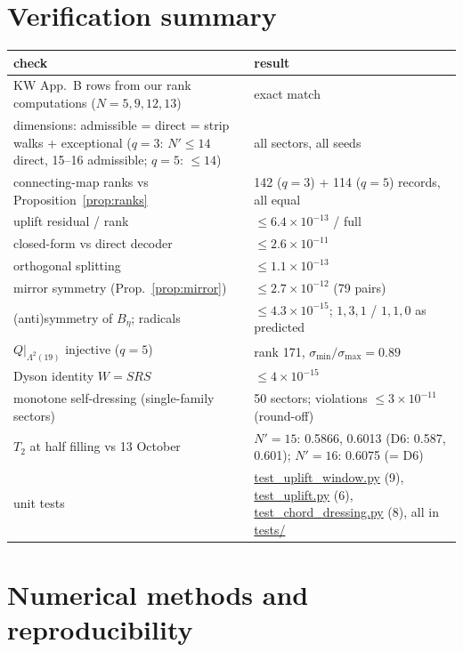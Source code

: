 \documentclass[11pt]{article}
\newcommand{\Np}{N'}
\theoremstyle{plain}
\theoremstyle{remark}
\numberwithin{equation}{section}
\begin{document}
\appendix
\section{Verification summary}\label{app:verify}
\begin{center}\small
\begin{tabular}{p{}p{}}
\toprule
check & result\\
\midrule
KW App.~B rows from our rank computations ($N=5,9,12,13$) & exact match\\
dimensions: admissible = direct = strip walks + exceptional ($q=3$: $\Np\le14$ direct, 15--16 admissible; $q=5$: $\le14$) & all sectors, all seeds\\
connecting-map ranks vs Proposition~\ref{prop:ranks} & 142 ($q=3$) + 114 ($q=5$) records, all equal\\
uplift residual / rank & $\le6.4\times10^{-13}$ / full\\
closed-form vs direct decoder & $\le2.6\times10^{-11}$\\
orthogonal splitting & $\le1.1\times10^{-13}$\\
mirror symmetry (Prop.~\ref{prop:mirror}) & $\le2.7\times10^{-12}$ (79 pairs)\\
(anti)symmetry of $B_\eta$; radicals & $\le4.3\times10^{-15}$; $1,3,1$ / $1,1,0$ as predicted\\
$Q|_{\Lambda^2(19)}$ injective ($q=5$) & rank 171, $\sigma_{\min}/\sigma_{\max}=0.89$\\
Dyson identity $W=SRS$ & $\le4\times10^{-15}$\\
monotone self-dressing (single-family sectors) & 50 sectors; violations $\le3\times10^{-11}$ (round-off)\\
$T_2$ at half filling vs 13 October & $\Np=15$: 0.5866, 0.6013 (D6: 0.587, 0.601); $\Np=16$: 0.6075 (= D6)\\
unit tests & \url{test_uplift_window.py} (9), \url{test_uplift.py} (6), \url{test_chord_dressing.py} (8), all in \url{tests/}\\
\bottomrule
\end{tabular}
\end{center}

\section{Numerical methods and reproducibility}\label{app:repro}
\end{document}
